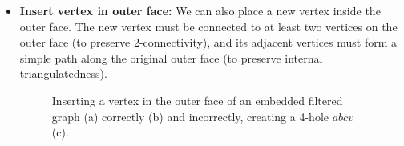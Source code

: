\begin{itemize}
	\clearpage
	\item \textbf{Insert vertex in outer face:} We can also place a new vertex inside the outer face. The new vertex must be connected to at least two vertices on the outer face (to preserve 2-connectivity), and its adjacent vertices must form a simple path along the original outer face (to preserve internal triangulatedness).
\begin{figure}[H]
	\centering
	\quad
	\quad
	\caption{Inserting a vertex in the outer face of an embedded filtered graph (a) correctly (b) and incorrectly, creating a 4-hole $abcv$ (c).}
	\label{fig:transformation}
\end{figure}


\end{itemize}
